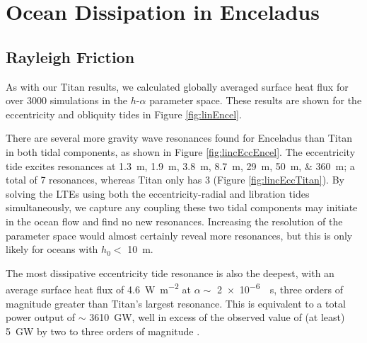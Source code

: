\section{Ocean Dissipation in Enceladus \label{sec:results_Enceladus}}

\subsection{Rayleigh Friction} \label{sec:ray_enc}

As with our Titan results, we calculated globally averaged surface heat flux for over 3000 simulations in the $h$-$\alpha$ parameter space. These results are shown for the eccentricity and obliquity tides in Figure \ref{fig:linEncel}.

There are several more gravity wave resonances found for Enceladus than Titan in both tidal components, as shown in Figure \ref{fig:lincEccEncel}. The eccentricity tide excites resonances at \SIlist{1.3;1.9;3.8;8.7;29;50;360}{m}; a total of 7 resonances, whereas Titan only has 3 (Figure \ref{fig:lincEccTitan}). By solving the LTEs using both the eccentricity-radial and libration tides simultaneously, we capture any coupling these two tidal components may initiate in the ocean flow and find no new resonances. Increasing the resolution of the parameter space would almost certainly reveal more resonances, but this is only likely for oceans with $h_0 <$ \SI{10}{\metre}. 

The most dissipative eccentricity tide resonance is also the deepest, with an average surface heat flux of \SI{4.6}{\watt\per\square\metre} at $\alpha\sim$ \SI{2e-6}{\per\second}, three orders of magnitude greater than Titan's largest resonance. This is equivalent to a total power output of $\sim$ \SI{3610}{\giga\watt}, well in excess of the observed value of (at least) \SI{5}{\giga\watt} by two to three orders of magnitude \citep{spencer2006cassini,howett2011high, spencer2013new}.  


